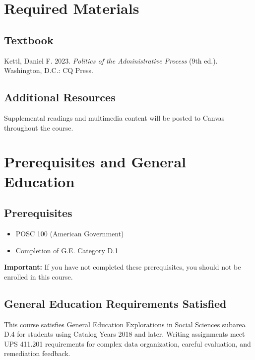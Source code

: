 \documentclass[11pt]{scrartcl} %
\begin{document}
\section{Required Materials}

\subsection{Textbook}
Kettl, Daniel F. 2023. \emph{Politics of the Administrative Process} (9th ed.). Washington, D.C.: CQ Press.

\subsection{Additional Resources}
Supplemental readings and multimedia content will be posted to Canvas throughout the course.

\section{Prerequisites and General Education}

\subsection{Prerequisites}
\begin{itemize}
\item POSC 100 (American Government)
\item Completion of G.E. Category D.1
\end{itemize}

\textbf{Important:} If you have not completed these prerequisites, you should not be enrolled in this course.

\subsection{General Education Requirements Satisfied}
This course satisfies General Education Explorations in Social Sciences subarea D.4 for students using Catalog Years 2018 and later. Writing assignments meet UPS 411.201 requirements for complex data organization, careful evaluation, and remediation feedback.
\end{document}
